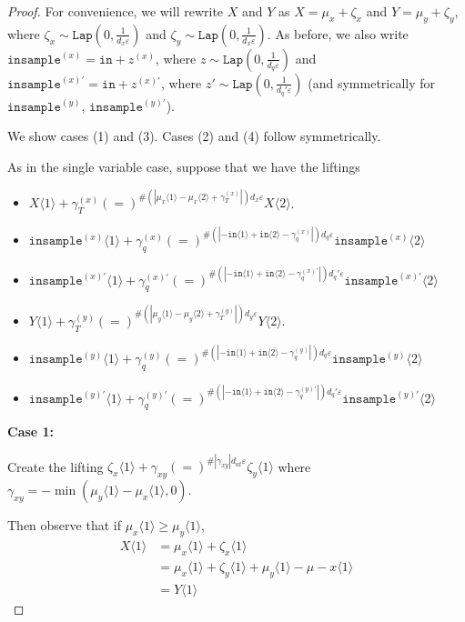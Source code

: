 \documentclass[12pt]{article}
\newcommand{\brangle}[1]{\langle #1 \rangle}
\newcommand{\Lap}{\texttt{Lap}}
\theoremstyle{definition}
\begin{document}
\begin{proof}
    For convenience, we will rewrite $X$ and $Y$ as $X = \mu_x + \zeta_x$ and $Y = \mu_y + \zeta_y$, where $\zeta_x \sim\Lap(0, \frac{1}{d_x\varepsilon})$ and $\zeta_y \sim\Lap(0, \frac{1}{d_x\varepsilon})$. 
    As before, we also write $\texttt{insample}^{(x)} = \texttt{in} + z^{(x)}$, where $z\sim\Lap(0, \frac{1}{d_q\varepsilon})$ and $\texttt{insample}^{(x)\prime} = \texttt{in} + z^{(x)\prime}$, where $z'\sim\Lap(0, \frac{1}{d_q'\varepsilon})$ (and symmetrically for $\texttt{insample}^{(y)}$, $\texttt{insample}^{(y)\prime}$).

    We show cases (1) and (3). Cases (2) and (4) follow symmetrically. 

    As in the single variable case, suppose that we have the liftings
    \begin{itemize}
        \item $X\brangle{1}+\gamma_T^{(x)} (=)^{\#(|\mu_x\brangle{1}-\mu_x\brangle{2}+\gamma_T^{(x)}|)d_x\varepsilon}X\brangle{2}$.
        \item $\texttt{insample}^{(x)}\brangle{1} +\gamma_q^{(x)}{(=)}^{\#(|-\texttt{in}\brangle{1}+\texttt{in}\brangle{2}-\gamma_q^{(x)}|)d_q\varepsilon}\texttt{insample}^{(x)}\brangle{2}$
        \item $\texttt{insample}^{(x)\prime}\brangle{1} +\gamma_q^{(x)\prime}{(=)}^{\#(|-\texttt{in}\brangle{1}+\texttt{in}\brangle{2}-\gamma_q^{(x)\prime}|)d_q'\varepsilon}\texttt{insample}^{(x)\prime}\brangle{2}$
        \item $Y\brangle{1}+\gamma_T^{(y)} (=)^{\#(|\mu_y\brangle{1}-\mu_y\brangle{2}+\gamma_T^{(y)}|)d_y\varepsilon}Y\brangle{2}$.
        \item $\texttt{insample}^{(y)}\brangle{1} +\gamma_q^{(y)}{(=)}^{\#(|-\texttt{in}\brangle{1}+\texttt{in}\brangle{2}-\gamma_q^{(y)}|)d_q\varepsilon}\texttt{insample}^{(y)}\brangle{2}$
        \item $\texttt{insample}^{(y)\prime}\brangle{1} +\gamma_q^{(y)\prime}{(=)}^{\#(|-\texttt{in}\brangle{1}+\texttt{in}\brangle{2}-\gamma_q^{(y)\prime}|)d_q'\varepsilon}\texttt{insample}^{(y)\prime}\brangle{2}$
    \end{itemize}

    \textbf{Case 1:}

    Create the lifting $\zeta_x\brangle{1} +\gamma_{xy}(=)^{\#|\gamma_{xy}|d_{at}\varepsilon}\zeta_y\brangle{1}$ where $\gamma_{xy} = -\min(\mu_y\brangle{1}-\mu_x\brangle{1}, 0)$. 

    Then observe that if $\mu_x\brangle{1}\geq \mu_y\brangle{1}$, \begin{align*}
        X\brangle{1}&= \mu_x\brangle{1} + \zeta_x\brangle{1}\\
        &= \mu_x\brangle{1} + \zeta_y\brangle{1}+\mu_y\brangle{1}-\mu-x\brangle{1}\\
        &=Y\brangle{1}
    \end{align*}


\end{proof}
\end{document}
